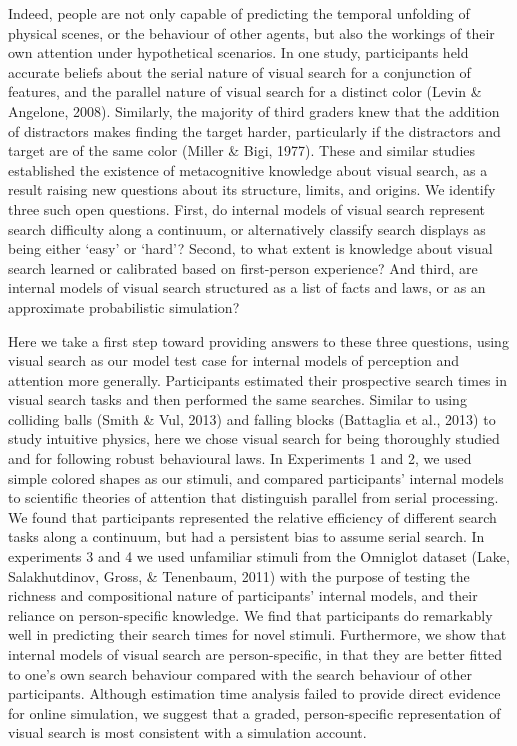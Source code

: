 \documentclass[12pt,twoside]{reedthesis}
\begin{document}
Indeed, people are not only capable of predicting the temporal unfolding of physical scenes, or the behaviour of other agents, but also the workings of their own attention under hypothetical scenarios. In one study, participants held accurate beliefs about the serial nature of visual search for a conjunction of features, and the parallel nature of visual search for a distinct color (Levin \& Angelone, 2008). Similarly, the majority of third graders knew that the addition of distractors makes finding the target harder, particularly if the distractors and target are of the same color (Miller \& Bigi, 1977). These and similar studies established the existence of metacognitive knowledge about visual search, as a result raising new questions about its structure, limits, and origins. We identify three such open questions. First, do internal models of visual search represent search difficulty along a continuum, or alternatively classify search displays as being either `easy' or `hard'? Second, to what extent is knowledge about visual search learned or calibrated based on first-person experience? And third, are internal models of visual search structured as a list of facts and laws, or as an approximate probabilistic simulation?

Here we take a first step toward providing answers to these three questions, using visual search as our model test case for internal models of perception and attention more generally. Participants estimated their prospective search times in visual search tasks and then performed the same searches. Similar to using colliding balls (Smith \& Vul, 2013) and falling blocks (Battaglia et al., 2013) to study intuitive physics, here we chose visual search for being thoroughly studied and for following robust behavioural laws. In Experiments 1 and 2, we used simple colored shapes as our stimuli, and compared participants' internal models to scientific theories of attention that distinguish parallel from serial processing. We found that participants represented the relative efficiency of different search tasks along a continuum, but had a persistent bias to assume serial search. In experiments 3 and 4 we used unfamiliar stimuli from the Omniglot dataset (Lake, Salakhutdinov, Gross, \& Tenenbaum, 2011) with the purpose of testing the richness and compositional nature of participants' internal models, and their reliance on person-specific knowledge. We find that participants do remarkably well in predicting their search times for novel stimuli. Furthermore, we show that internal models of visual search are person-specific, in that they are better fitted to one's own search behaviour compared with the search behaviour of other participants. Although estimation time analysis failed to provide direct evidence for online simulation, we suggest that a graded, person-specific representation of visual search is most consistent with a simulation account.
\end{document}
